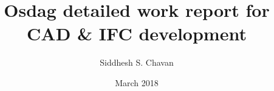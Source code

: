 %
%
\clearpage%

\title{Osdag detailed work report for CAD \& IFC development}
\author{Siddhesh S. Chavan}
\date{March 2018}
%
%
% 
%
%
%
%
%
\maketitle
%
% 
%
